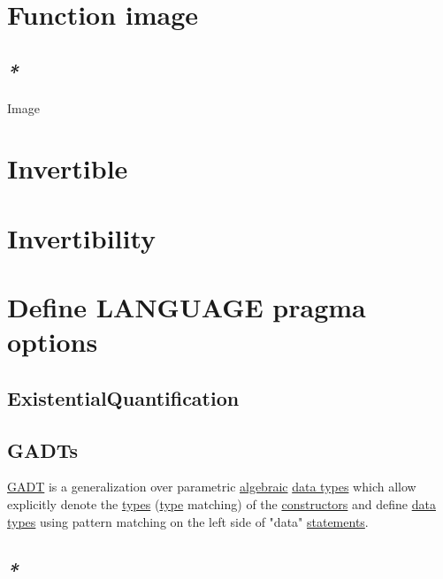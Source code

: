\documentclass[a4paper,14pt,oneside]{book}
\begin{document}
{\chapter{\label{orgec79eec}Function image}
\label{sec:org38fea0d}

\section{\emph{*}}
\label{sec:org1918017}

\label{org270220b}Image\\

\chapter{\label{org0b651ed}Invertible}
\label{sec:org0da3874}
\chapter{\label{orgaf22377}Invertibility}
\label{sec:org7a1facb}
\chapter{\label{org9746f76}Define LANGUAGE pragma options}
\label{sec:orgf7f3ee1}

\section{\label{org8f0e5d4}ExistentialQuantification}
\label{sec:org4b169db}

\section{\label{org7336225}GADTs}
\label{sec:org89f578a}

\hyperref[orgd20403a]{GADT} is a generalization over parametric \hyperref[org312c3a4]{algebraic} \hyperref[org6c691ac]{data types} which allow explicitly denote the \hyperref[org51532d9]{types} (\hyperref[orga9ca243]{type} matching) of the \hyperref[org21599a8]{constructors} and define \hyperref[org6c691ac]{data types} using pattern matching on the left side of "data" \hyperref[orgf6daaf5]{statements}.\\

\section{\emph{*}}
\label{sec:org629c7ff}

}
\end{document}
